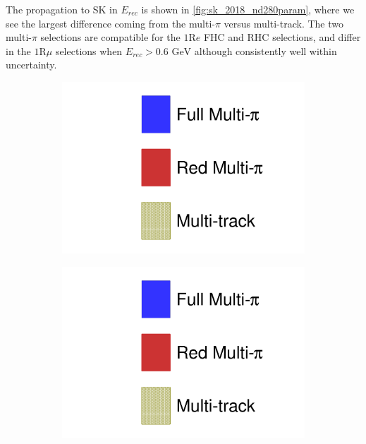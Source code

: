 The propagation to SK in $E_{rec}$ is shown in \autoref{fig:sk_2018_nd280param}, where we see the largest difference coming from the multi-$\pi$ versus multi-track. The two multi-$\pi$ selections are compatible for the $1\text{R}e$ FHC and RHC selections, and differ in the $1\text{R}\mu$ selections when $E_{rec}>0.6\text{ GeV}$ although consistently well within uncertainty.
\begin{figure}[h]
	\begin{subfigure}[t]{0.32\textwidth}
		\includegraphics[width=\textwidth, trim={0mm 0mm 0mm 0mm}, clip, page=1]{figures/mach3/2018/data/2018_results_test_spectra_2018_results_test_redcov_spectra_2018_results_test_multitrack_spectra}
	\end{subfigure}
	\begin{subfigure}[t]{0.32\textwidth}
		\includegraphics[width=\textwidth, trim={0mm 0mm 0mm 0mm}, clip, page=5]{figures/mach3/2018/data/2018_results_test_spectra_2018_results_test_redcov_spectra_2018_results_test_multitrack_spectra}

\end{subfigure}
\end{figure}
